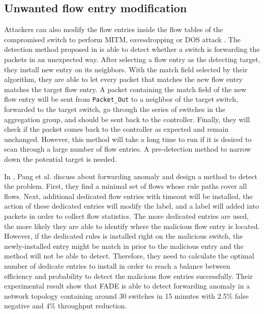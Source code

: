 \subsection{Unwanted flow entry modification}
Attackers can also modify the flow entries inside the flow tables of the compromised switch to perform MITM, eavesdropping or DOS attack \cite{AAS14}. The detection method proposed in \cite{CKGL15} is able to detect whether a switch is forwarding the packets in an unexpected way. After selecting a flow entry as the detecting target, they install new entry on its neighbors. With the match field selected by their algorithm, they are able to let every packet that matches the new flow entry matches the target flow entry. A packet containing the match field of the new flow entry will be sent from \texttt{Packet\_Out} to a neighbor of the target switch, forwarded to the target switch, go through the series of switches in the aggregation group, and should be sent back to the controller. Finally, they will check if the packet comes back to the controller as expected and remain unchanged. However, this method will take a long time to run if it is desired to scan through a large number of flow entries. A pre-detection method to narrow down the potential target is needed.

In \cite{PJL16}, Pang et al. discuss about forwarding anomaly and design a method to detect the problem. First, they find a minimal set of flows whose rule paths cover all flows. Next, additional dedicated flow entries with timeout will be installed, the action of these dedicated entries will modify the label, and a label will added into packets in order to collect flow statistics. The more dedicated entries are used, the more likely they are able to identify where the malicious flow entry is located. However, if the dedicated rules is installed right on the malicious switch, the newly-installed entry might be match in prior to the malicious entry and the method will not be able to detect. Therefore, they need to calculate the optimal number of dedicate entries to install in order to reach a balance between efficiency and probability to detect the malicious flow entries successfully. Their experimental result show that FADE is able to detect forwarding anomaly in a network topology containing around 30 switches in 15 minutes with 2.5\% false negative and 4\% throughput reduction.

